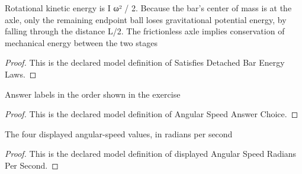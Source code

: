 \begin{definition}
  \label{def:physics:phyx-mini-0782:phyxminiproblems-problemphyxmini0782-satisfiesdetachedbarenergylaws}
  Rotational kinetic energy is I ω² / 2. Because the bar's center of mass is at the axle, only the remaining endpoint ball loses gravitational potential energy, by falling through the distance L/2. The frictionless axle implies conservation of mechanical energy between the two stages
\end{definition}
\begin{proof}
  This is the declared model definition of Satisfies Detached Bar Energy Laws.
\end{proof}
\begin{definition}
  \label{def:physics:phyx-mini-0782:phyxminiproblems-problemphyxmini0782-angularspeedanswerchoice}
  Answer labels in the order shown in the exercise
\end{definition}
\begin{proof}
  This is the declared model definition of Angular Speed Answer Choice.
\end{proof}
\begin{definition}
  \label{def:physics:phyx-mini-0782:phyxminiproblems-problemphyxmini0782-displayedangularspeedradianspersecond}
  The four displayed angular-speed values, in radians per second
\end{definition}
\begin{proof}
  This is the declared model definition of displayed Angular Speed Radians Per Second.
\end{proof}
